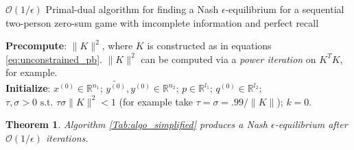 \documentclass[12pt]{article}
\newtheorem{theorem}{Theorem} \newtheorem{lemma}[theorem]{Lemma}
\begin{document}
\begin{algorithm}[G_2]
  \caption{$\mathcal{O}(1/\epsilon)$ Primal-dual algorithm for finding a Nash $\epsilon$-equilibrium for a sequential two-person zero-sum game with imcomplete information and perfect recall}
  \textbf{Precompute}: $\|K\|^2$, where $K$ is constructed as in equations \eqref{eq:unconstrained_pb}. $\|K\|^2$ can be computed via a \textit{power iteration} on $K^TK$, for example.\\
  \textbf{Initialize}:
  $x^{(0)} \in \mathbb{R}^{n_1}$; $\tilde{y^{(0)}}, y^{(0)} \in \mathbb{R}^{n_2}$; $p \in \mathbb{R}^{l_1}$; $q^{(0)} \in \mathbb{R}^{l_2}$; 
  $\tau, \sigma > 0 \text{ s.t. }\tau\sigma \|K\|^2 < 1$ (for example take $\tau = \sigma = .99/\|K\|$); $k = 0$.\\
  \label{Tab:algo_simplified}
\end{algorithm}
\begin{theorem}
  \label{thm:conv}
  Algorithm \ref{Tab:algo_simplified} produces a Nash $\epsilon$-equilibrium after $\mathcal{O}(1/\epsilon)$ iterations.
\end{theorem}
\end{document}
